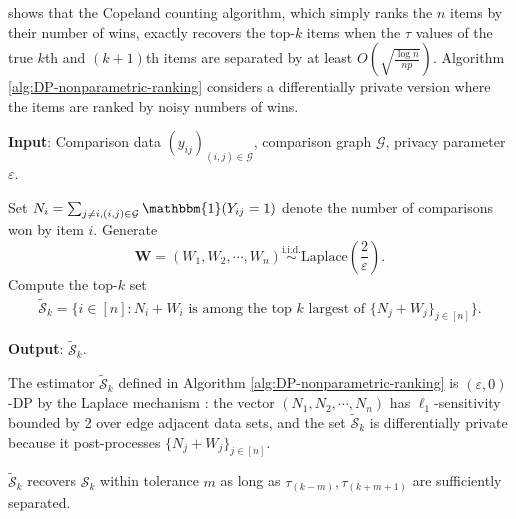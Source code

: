 \documentclass[letterpaper,12pt]{article}
\numberwithin{equation}{section}
\theoremstyle{plain}
\numberwithin{Theorem}{section}
\numberwithin{corollary}{section}
\numberwithin{proposition}{section}
\numberwithin{Lemma}{section}
{
	\theoremstyle{definition}
	\newtheorem{Definition}{Definition}
	\newtheorem{example}{Example}
	\numberwithin{example}{section}
	\newtheorem{fact}{Fact}
	\numberwithin{fact}{section}
	\newtheorem{remark}{Remark}
}
\newcommand{\1}{\mathbbm{1}}
\begin{document}
\cite{shah2017simple} shows that the Copeland counting algorithm, which simply ranks the $n$ items by their number of wins, exactly recovers the top-$k$ items when the $\tau$ values of the true $k$th and $(k+1)$th items are separated by at least $O\left(\sqrt{\frac{\log n}{np}}\right)$. Algorithm \ref{alg:DP-nonparametric-ranking} considers a differentially private version where the items are ranked by noisy numbers of wins.

\begin{algorithm}
	\caption{Differentially Private Ranking for nonparametric models} 
	\label{alg:DP-nonparametric-ranking}
	\textbf{Input}: Comparison data $(y_{ij})_{(i,j)\in \mathcal{G}}$, comparison graph $\mathcal{G}$, privacy parameter $\varepsilon$.
	\begin{algorithmic}[1]
		\State Set $N_i = \sum_{j \neq i,(i,j)\in \mathcal{G}} \1(Y_{ij} = 1)$ denote the number of comparisons won by item $i$.
		\State Generate 
		$$
		\bm W = (W_1, W_2, \cdots, W_n) \stackrel{\text{i.i.d.}}{\sim }\text{Laplace}\left(\frac{2}{\varepsilon}\right).
		$$
		\State Compute the top-$k$ set 
		\begin{align*}
			\widetilde {\mathcal S}_k = \{i \in [n]: N_i + W_i \text{ is among the top $k$ largest of }\{N_j + W_j\}_{j \in [n]}\}.
		\end{align*}
	\end{algorithmic} 
	\textbf{Output}: $\widetilde {\mathcal S}_k$.
\end{algorithm}

The estimator $\widetilde {\mathcal S}_k$ defined in Algorithm \ref{alg:DP-nonparametric-ranking} is $(\varepsilon, 0)$-DP by the Laplace mechanism \cite{dwork2006calibrating}: the vector $(N_1, N_2, \cdots, N_n)$ has $\ell_1$-sensitivity bounded by 2 over edge adjacent data sets, and the set $\widetilde {\mathcal S}_k$ is differentially private because it post-processes $\{N_j + W_j\}_{j \in [n]}$. 

$\widetilde {\mathcal S}_k$ recovers $\mathcal S_k$ within tolerance $m$ as long as $\tau_{(k-m)}, \tau_{(k+m+1)}$ are sufficiently separated.
\end{document}
